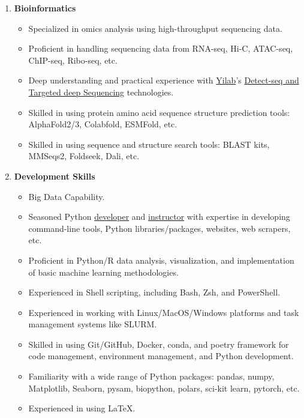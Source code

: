 \begin{enumerate}
    \item \textbf{Bioinformatics}
    \begin{itemize}
        \item Specialized in omics analysis using high-throughput sequencing data.
        \item Proficient in handling sequencing data from RNA-seq, Hi-C, ATAC-seq, ChIP-seq, Ribo-seq, etc.
        \item Deep understanding and practical experience with \href{https://yilab.org.cn/}{Yilab}'s \href{https://www.nature.com/articles/s41586-022-04836-5}{Detect-seq and Targeted deep Sequencing} technologies.
        \item Skilled in using protein amino acid sequence structure prediction tools: AlphaFold2/3, Colabfold, ESMFold, etc.
        \item Skilled in using sequence and structure search tools: BLAST kits, MMSeqs2, Foldseek, Dali, etc.
    \end{itemize}
    \item \textbf{Development Skills}
    \begin{itemize}
        \item Big Data Capability.
        \item Seasoned Python \href{https://github.com/hermanzhaozzzz}{developer} and \href{https://www.bioinfo.info/p/t_pc/goods_pc_detail/goods_detail/course_2SvfNlIVzrKfOcexHk9Nute5Bhd}{instructor} with expertise in developing 
        command-line tools, Python libraries/packages, websites, web scrapers, etc.
        \item Proficient in Python/R data analysis, visualization, and implementation of basic machine learning methodologies.
        \item Experienced in Shell scripting, including Bash, Zsh, and PowerShell.
        \item Experienced in working with Linux/MacOS/Windows platforms and task management systems like SLURM.
        \item Skilled in using Git/GitHub, Docker, conda, and poetry framework for code management, environment management, and Python development.
        \item Familiarity with a wide range of Python packages: pandas, numpy, Matplotlib, Seaborn, pysam, biopython, polars, sci-kit learn, pytorch, etc.
        \item Experienced in using \LaTeX.
    \end{itemize}

\end{enumerate}
